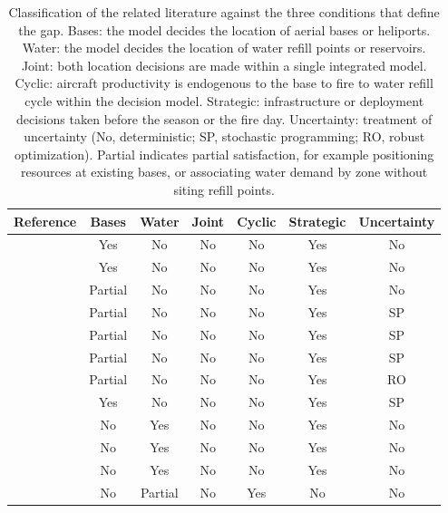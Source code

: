 \documentclass[11pt]{article}
\begin{document}
\begin{table}[!htbp]
\centering
\begin{threeparttable}
\caption{Classification of the related literature against the three
conditions that define the gap. Bases: the model decides the location
of aerial bases or heliports. Water: the model decides the location of
water refill points or reservoirs. Joint: both location decisions are
made within a single integrated model. Cyclic: aircraft productivity is
endogenous to the base to fire to water refill cycle within the
decision model. Strategic: infrastructure or deployment decisions taken
before the season or the fire day. Uncertainty: treatment of
uncertainty (No, deterministic; SP, stochastic programming; RO, robust
optimization). Partial indicates partial satisfaction, for example
positioning resources at existing bases, or associating water demand by
zone without siting refill points.}
\label{tab:gap}
\small
\setlength{\tabcolsep}{5pt}
\begin{tabular}{lcccccc}
\toprule
Reference & Bases & Water & Joint & Cyclic & Strategic & Uncertainty \\
\midrule
\citet{hodgson1978}                    & Yes     & No      & No & No  & Yes & No \\
\citet{maclellan1996}\tnote{a}         & Yes     & No      & No & No  & Yes & No \\
\citet{skold2024}\tnote{b}             & Partial & No      & No & No  & Yes & No \\
\citet{haight2007}                     & Partial & No      & No & No  & Yes & SP \\
\citet{ntaimo2013}                     & Partial & No      & No & No  & Yes & SP \\
\citet{wei2015}                        & Partial & No      & No & No  & Yes & SP \\
\citet{mendes2025}                     & Partial & No      & No & No  & Yes & RO \\
\citet{huang2025}                      & Yes     & No      & No & No  & Yes & SP \\
\citet{alfaro2024}                     & No      & Yes     & No & No  & Yes & No \\
\citet{ramalho2021}                    & No      & Yes     & No & No  & Yes & No \\
\citet{ramalho2024}                    & No      & Yes     & No & No  & Yes & No \\
\citet{rodriguezveiga2018}             & No      & Partial & No & Yes & No  & No \\

\end{tabular}
\end{threeparttable}
\end{table}
\end{document}
